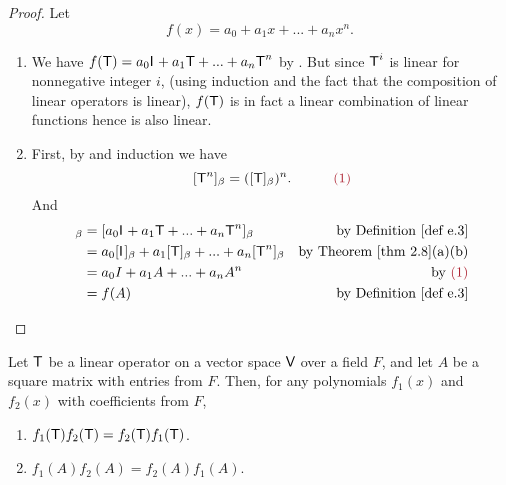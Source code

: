 \begin{proof}
Let
\[
    f(x) = a_0 + a_1 x + ... + a_n x^n.
\]
\begin{enumerate}
\item We have \(f(\textsf{T}) = a_0 \textsf{I}_{_{}} + a_1 \textsf{T} + ... + a_n \textsf{T}^n\) by .
But since \(\textsf{T}^i\) is linear for nonnegative integer \(i\), (using induction and the fact that the composition of linear operators is linear), \(f(\textsf{T})\) is in fact a linear combination of linear functions hence is also linear.

\item
First, by  and induction we have
\[
     [\T^n]_{\beta} = ([\T]_{\beta})^n. \quad \quad \quad \MAROON{(1)}
\]
And
\begin{align*}
    [f(\T)]_{\beta} & = [a_0 \ITRAN{} + a_1 \T + ... + a_n \T^n]_{\beta} & \text{by \DEF{e.3}} \\
        & = a_0 [\ITRAN{}]_{\beta} + a_1 [\T]_{\beta} + ... + a_n [\T^n]_{\beta} & \text{by \THM{2.8}(a)(b)} \\
        & = a_0 I + a_1 A + ... + a_n A^n & \text{by \MAROON{(1)}} \\
        & = f(A) & \text{by \DEF{e.3}}
\end{align*}
\end{enumerate}
\end{proof}

\begin{appendix theorem} \label{thm e.4}
Let \(\textsf{T}\) be a linear operator on a vector space \(\textsf{V}\) over a field \(F\), and let \(A\) be a square matrix with entries from \(F\).
Then, for any polynomials \(f_1(x)\) and \(f_2(x)\) with coefficients from \(F\),
\begin{enumerate}
\item \(f_1(\textsf{T})f_2(\textsf{T}) = f_2(\textsf{T})f_1(\textsf{T})\).
\item \(f_1(A)f_2(A) = f_2(A)f_1(A)\).
\end{enumerate}
\end{appendix theorem}

